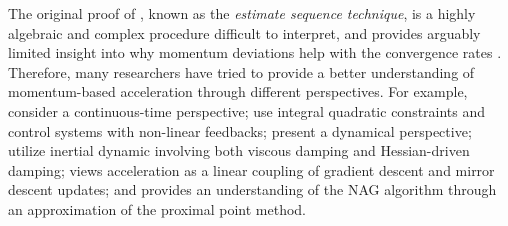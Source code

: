 \documentclass{article}
\theoremstyle{plain}
\theoremstyle{definition}
\theoremstyle{remark}
\newcommand{\aynote}[1]{\textcolor{red}{[\textbf{Note:} #1]}}
\newcommand{\hmnote}[1]{\textcolor{purple}{[\textbf{Note:} #1]}}
\begin{document}
The original proof of \citet{Nesterov1983AMF}, known as the \emph{estimate sequence technique}, is a highly algebraic and complex procedure difficult to interpret, and provides arguably limited insight into why momentum deviations help with the convergence rates \citep{hu2017dissipativity}. Therefore, many researchers have tried to provide a better understanding of momentum-based acceleration through different perspectives. For example, \citet{JMLR:v17:15-084,shi2019acceleration,Shi2021UnderstandingTA,sanz2021connections} consider a continuous-time perspective; \citet{Lessard2016AnalysisAD,doi:10.1137/17M1136845} use integral quadratic constraints and control systems with non-linear feedbacks; \citet{muehlebach2019dynamical,muehlebach2022constraints,muehlebach2023accelerated} present a dynamical perspective; \citet{attouch2020first,attouch2021convergence} utilize inertial dynamic involving both viscous damping and Hessian-driven damping; \citet{Zhu2014LinearCA} views acceleration as a linear coupling of gradient descent and mirror descent updates; and \citet{ahn2022understanding} provides an understanding of the NAG algorithm through an approximation of the proximal point method. 
\end{document}

